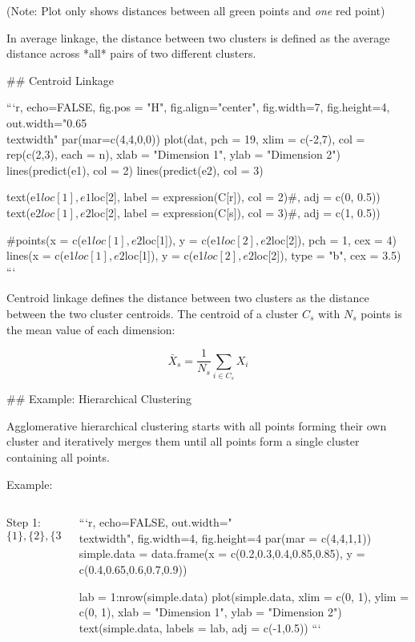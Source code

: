 \begin{center}
{\scriptsize (Note: Plot only shows distances between all green points and
\textit{one} red point)}
\end{center}

In average linkage, the distance between two clusters is defined as the average
distance across *all* pairs of two different clusters.

## Centroid Linkage

```{r, echo=FALSE, fig.pos = "H", fig.align="center", fig.width=7, fig.height=4, out.width="0.65\\textwidth"}
par(mar=c(4,4,0,0))
plot(dat, pch = 19, xlim = c(-2,7), col = rep(c(2,3), each = n),
  xlab = "Dimension 1", ylab = "Dimension 2")
lines(predict(e1), col = 2)
lines(predict(e2), col = 3)

text(e1$loc[1], e1$loc[2], label = expression(C[r]), col = 2)#, adj = c(0, 0.5))
text(e2$loc[1], e2$loc[2], label = expression(C[s]), col = 3)#, adj = c(1, 0.5))


#points(x = c(e1$loc[1], e2$loc[1]), y = c(e1$loc[2], e2$loc[2]), pch = 1, cex = 4)
lines(x = c(e1$loc[1], e2$loc[1]), y = c(e1$loc[2], e2$loc[2]), type = "b", cex = 3.5)
```

\small
Centroid linkage defines the distance between two clusters as the distance between the two cluster centroids.
The centroid of a cluster $C_s$ with $N_s$ points is the mean value of each dimension:

\[\bar{X}_s = \frac{1}{N_s} \sum_{i \in C_s} X_i\]

## Example: Hierarchical Clustering

Agglomerative hierarchical clustering starts with all points forming their own cluster and iteratively merges them until all points form a single cluster containing all points.

Example:

\begin{columns}

\begin{column}{0.5\textwidth}
Step 1: $\{1\},\{2\},\{3\},\{4\},\{5\}$ \\
\end{column}
\begin{column}{0.4\textwidth}

```{r, echo=FALSE, out.width="\\textwidth", fig.width=4, fig.height=4}
par(mar = c(4,4,1,1))
simple.data = data.frame(x = c(0.2,0.3,0.4,0.85,0.85),
  y = c(0.4,0.65,0.6,0.7,0.9))

lab = 1:nrow(simple.data)
plot(simple.data, xlim = c(0, 1), ylim = c(0, 1), xlab = "Dimension 1", ylab = "Dimension 2")
text(simple.data, labels = lab, adj = c(-1,0.5))
```

\end{column}
\end{columns}


